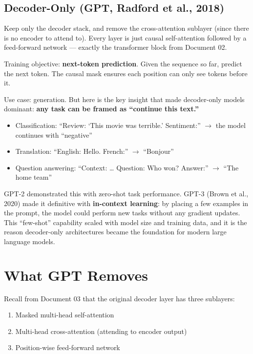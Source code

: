 \subsection{Decoder-Only (GPT, Radford et al., 2018)}

Keep only the decoder stack, and remove the cross-attention sublayer (since there is no encoder to attend to). Every layer is just causal self-attention followed by a feed-forward network --- exactly the transformer block from Document 02.

Training objective: \textbf{next-token prediction}. Given the sequence so far, predict the next token. The causal mask ensures each position can only see tokens before it.

Use case: generation. But here is the key insight that made decoder-only models dominant: \textbf{any task can be framed as ``continue this text.''}

\begin{itemize}
  \item Classification: ``Review: `This movie was terrible.' Sentiment:'' $\rightarrow$ the model continues with ``negative''
  \item Translation: ``English: Hello. French:'' $\rightarrow$ ``Bonjour''
  \item Question answering: ``Context: \ldots{} Question: Who won? Answer:'' $\rightarrow$ ``The home team''
\end{itemize}

GPT-2 demonstrated this with zero-shot task performance. GPT-3 (Brown et al., 2020) made it definitive with \textbf{in-context learning}: by placing a few examples in the prompt, the model could perform new tasks without any gradient updates. This ``few-shot'' capability scaled with model size and training data, and it is the reason decoder-only architectures became the foundation for modern large language models.

\section{What GPT Removes}

Recall from Document 03 that the original decoder layer has three sublayers:

\begin{enumerate}
  \item Masked multi-head self-attention
  \item Multi-head cross-attention (attending to encoder output)
  \item Position-wise feed-forward network
\end{enumerate}

